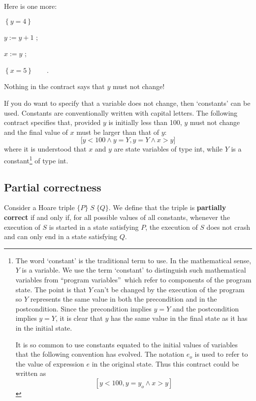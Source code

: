\documentclass[muchmore,11pt]{article}%
\begin{document}
\noindent Here is one more:

\begin{code}
$\left\{  y=4\right\}  $

$y:=y+1$ ;

$x:=y$ ;

$\left\{  x=5\right\}  \qquad$.
\end{code}

\noindent Nothing in the contract says that $y$ must not change!

If you do want to specify that a variable does not change, then `constants'
can be used. Constants are conventionally written with capital letters. The
following contract specifies that, provided $y$ is initially less than 100,
$y$ must not change and the final value of $x$ must be larger than that of
$y$:%
\[
\lbrack y<\mathrm{100}\wedge y=Y,y=Y\wedge x>y]
\]
where it is understood that $x$ and $y$ are state variables of type
\textsf{int},\textsf{ }while $Y$ is a constant\footnote{The word `constant' is
the traditional term to use. In the mathematical sense, $Y$ is a variable. We
use the term `constant' to distinguish such mathematical variables from
\textquotedblleft program variables\textquotedblright\ which refer to
components of the program state. The point is that $Y\ $can't be changed by
the execution of the program so $Y$ represents the same value in both the
precondition and in the postcondition. Since the precondition implies $y=Y$
and the postcondition implies $y=Y$, it is clear that $y$ has the same value
in the final state as it has in the initial state.
\par
It is so common to use constants equated to the initial values of variables
that the following convention has evolved. The notation $e_{o}$ is used to
refer to the value of expression $e$ in the original state. Thus this contract
could be written as%
\[
\left[  y<100,y=y_{o}\wedge x>y\right]
\]
} of type \textsf{int}.

\subsection{Partial correctness}

Consider a Hoare triple $\{P\}\;S\;\{Q\}$. We define that the triple is
\textbf{partially correct} if and only if, for all possible values of all
constants, whenever the execution of $S$ is started in a state satisfying $P$,
the execution of $S$ does not crash and can only end in a state satisfying $Q$.
\end{document}
